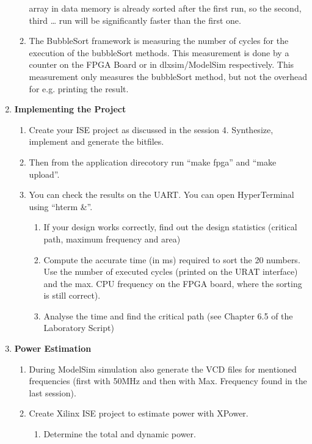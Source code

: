 \begin{enumerate}
\begin{enumerate}
		array in data memory is already sorted after the first run, so the
		second, third \ldots{} run will be significantly faster than the
		first one.
		\item
		The BubbleSort framework is measuring the number of cycles for the
		execution of the bubbleSort methods. This measurement is done by a
		counter on the FPGA Board or in dlxsim/ModelSim respectively. This
		measurement only measures the bubbleSort method, but not the
		overhead for e.g. printing the result.
	\end{enumerate}
\item \textbf{Implementing the Project}
	\begin{enumerate}
		\item
		Create your ISE project as discussed in the session 4. Synthesize,
		implement and generate the bitfiles.
		\item
		Then from the application direcotory run ``make fpga'' and ``make
		upload''.
		\item
		You can check the results on the UART. You can open HyperTerminal
		using ``hterm \&''.
		\begin{enumerate}[label=(\alph*),start=1]
			\color{red}\item\normalcolor
			If your design works correctly, find out the design statistics
			(critical path, maximum frequency and area)
			\color{red}\item\normalcolor
			Compute the accurate time (in ms) required to sort the 20 numbers. Use
			the number of executed cycles (printed on the URAT interface) and the
			max. CPU frequency on the FPGA board, where the sorting is still
			correct).
			\color{red}\item\normalcolor
			Analyse the time and find the critical path (see Chapter 6.5 of the
			Laboratory Script)
		\end{enumerate}
	\end{enumerate}
\item \textbf{Power Estimation}
	\begin{enumerate}
		\item
		During ModelSim simulation also generate the VCD files for mentioned
		frequencies (first with 50MHz and then with Max. Frequency found in
		the last session).
		\item
		Create Xilinx ISE project to estimate power with XPower.
		\begin{enumerate}[label=(\alph*),start=4]
			\color{red}\item\normalcolor
			Determine the total and dynamic power.

\end{enumerate}
\end{enumerate}
\end{enumerate}
